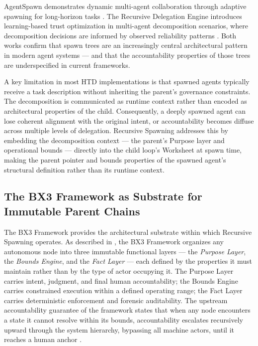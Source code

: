AgentSpawn demonstrates dynamic multi-agent collaboration through adaptive spawning for long-horizon tasks \cite{agentspawn2026}. The Recursive Delegation Engine introduces learning-based trust optimization in multi-agent decomposition scenarios, where decomposition decisions are informed by observed reliability patterns \cite{rde2025}. Both works confirm that spawn trees are an increasingly central architectural pattern in modern agent systems — and that the accountability properties of those trees are underspecified in current frameworks.

A key limitation in most HTD implementations is that spawned agents typically receive a task description without inheriting the parent's governance constraints. The decomposition is communicated as runtime context rather than encoded as architectural properties of the child. Consequently, a deeply spawned agent can lose coherent alignment with the original intent, or accountability becomes diffuse across multiple levels of delegation. Recursive Spawning addresses this by embedding the decomposition context — the parent's Purpose layer and operational bounds — directly into the child loop's Worksheet at spawn time, making the parent pointer and bounds properties of the spawned agent's structural definition rather than its runtime context.

\subsection{The BX3 Framework as Substrate for Immutable Parent Chains}

The BX3 Framework provides the architectural substrate within which Recursive Spawning operates. As described in \cite{bx3framework2026}, the BX3 Framework organizes any autonomous node into three immutable functional layers — the \textit{Purpose Layer}, the \textit{Bounds Engine}, and the \textit{Fact Layer} — each defined by the properties it must maintain rather than by the type of actor occupying it. The Purpose Layer carries intent, judgment, and final human accountability; the Bounds Engine carries constrained execution within a defined operating range; the Fact Layer carries deterministic enforcement and forensic auditability. The upstream accountability guarantee of the framework states that when any node encounters a state it cannot resolve within its bounds, accountability escalates recursively upward through the system hierarchy, bypassing all machine actors, until it reaches a human anchor \cite{bx3framework2026}.

